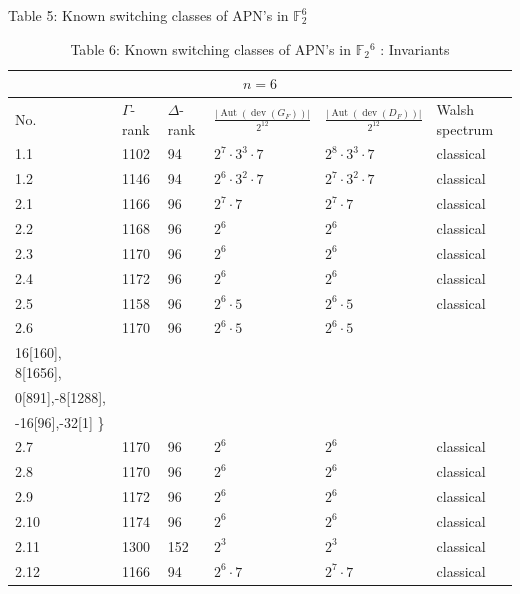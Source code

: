\documentclass[10pt]{article}
\begin{document}
Table 5: Known switching classes of APN's in $\mathbb{F}_{2}^{6}$

\begin{table}[h]
\begin{center}
\begin{tabular}{|l|l|l|l|l|l|}
\hline
\multicolumn{6}{|c|}{$n=6$} \\
\hline
No. & $\Gamma$-rank & $\Delta$-rank & $\frac{\left|\operatorname{Aut}\left(\operatorname{dev}\left(G_{F}\right)\right)\right|}{2^{12}}$ & $\frac{\left|\operatorname{Aut}\left(\operatorname{dev}\left(D_{F}\right)\right)\right|}{2^{12}}$ & Walsh spectrum \\
\hline
1.1 & 1102 & 94 & $2^{7} \cdot 3^{3} \cdot 7$ & $2^{8} \cdot 3^{3} \cdot 7$ & classical \\
\hline
1.2 & 1146 & 94 & $2^{6} \cdot 3^{2} \cdot 7$ & $2^{7} \cdot 3^{2} \cdot 7$ & classical \\
\hline
2.1 & 1166 & 96 & $2^{7} \cdot 7$ & $2^{7} \cdot 7$ & classical \\
\hline
2.2 & 1168 & 96 & $2^{6}$ & $2^{6}$ & classical \\
\hline
2.3 & 1170 & 96 & $2^{6}$ & $2^{6}$ & classical \\
\hline
2.4 & 1172 & 96 & $2^{6}$ & $2^{6}$ & classical \\
\hline
2.5 & 1158 & 96 & $2^{6} \cdot 5$ & $2^{6} \cdot 5$ & classical \\
\hline
2.6 & 1170 & 96 & $2^{6} \cdot 5$ & $2^{6} \cdot 5$ & \( \begin{gathered} \{* 64[1], 32[3], \\ 16[160], 8[1656], \\ 0[891],-8[1288], \\ -16[96],-32[1] \quad *\} \end{gathered} \) \\
\hline
2.7 & 1170 & 96 & $2^{6}$ & $2^{6}$ & classical \\
\hline
2.8 & 1170 & 96 & $2^{6}$ & $2^{6}$ & classical \\
\hline
2.9 & 1172 & 96 & $2^{6}$ & $2^{6}$ & classical \\
\hline
2.10 & 1174 & 96 & $2^{6}$ & $2^{6}$ & classical \\
\hline
2.11 & 1300 & 152 & $2^{3}$ & $2^{3}$ & classical \\
\hline
2.12 & 1166 & 94 & $2^{6} \cdot 7$ & $2^{7} \cdot 7$ & classical \\
\hline
\end{tabular}
\captionsetup{labelformat=empty}
\caption{Table 6: Known switching classes of APN's in $\mathbb{F}_{2}{ }^{6}$ : Invariants}
\end{center}
\end{table}
\end{document}
